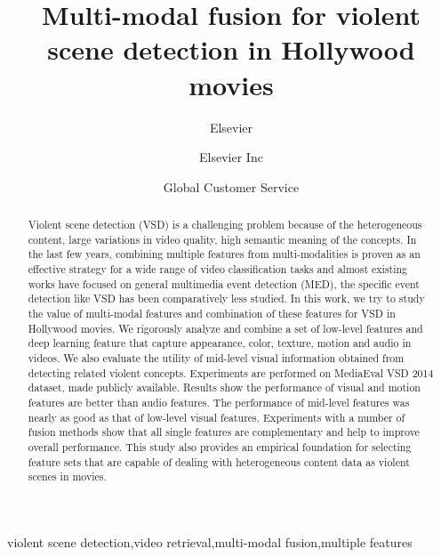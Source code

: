 \documentclass[review]{elsarticle}
\begin{document}
\begin{frontmatter}

\title{Multi-modal fusion for violent scene detection in Hollywood movies}

\author{Elsevier}
\address{Radarweg 29, Amsterdam}

\author[mymainaddress,mysecondaryaddress]{Elsevier Inc}

\author[mysecondaryaddress]{Global Customer Service}

\address[mymainaddress]{1600 John F Kennedy Boulevard, Philadelphia}
\address[mysecondaryaddress]{360 Park Avenue South, New York}

\begin{abstract}
Violent scene detection (VSD) is a challenging problem because of the heterogeneous content, large variations in video quality, high semantic meaning of the concepts. In the last few years, combining multiple features from multi-modalities is proven as an effective strategy for a wide range of video classification tasks and almost existing works have focused on general multimedia event detection (MED), the specific event detection like VSD has been comparatively less studied. In this work, we try to study the value of multi-modal features and combination of these features for VSD in Hollywood movies. We rigorously analyze and combine a set of low-level features and deep learning feature that capture appearance, color, texture, motion and audio in videos. We also evaluate the utility of mid-level visual information obtained from detecting related violent concepts. Experiments are performed on MediaEval VSD 2014 dataset, made publicly available. Results show the performance of visual and motion features are better than audio features. The performance of mid-level features was nearly as good as that of low-level visual features. Experiments with a number of fusion methods show that all single features are complementary and help to improve overall performance. This study also provides an empirical foundation for selecting feature sets that are capable of dealing with heterogeneous content data as violent scenes in movies.
\end{abstract}

\begin{keyword}
violent scene detection,video retrieval,multi-modal fusion,multiple features
\end{keyword}

\end{frontmatter}
\end{document}
